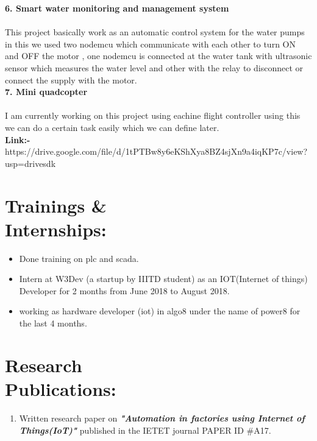 \documentclass[10pt]{report}
\begin{document}
\noindent\textbf{\large 6. Smart water monitoring and management system\\[1pt]}
\\This project basically work as an automatic control system for the water pumps in this we used two nodemcu which communicate with each other to turn ON and OFF the motor , one nodemcu is connected at the water tank with ultrasonic sensor which measures the water level and other with the relay to disconnect or connect the supply with the motor.\\[2pt] 

\noindent\textbf{\large 7. Mini quadcopter\\[1pt]}
\\I am currently working on this project using eachine flight controller using this we can do a certain task easily which we can define later.
\\\textbf{Link:-} https://drive.google.com/file/d/1tPTBw8y6eKShXya8BZ4sjXn9a4iqKP7c/view?usp=drivesdk




\section*{Trainings \&\\ Internships:} %
\begin{itemize}
\item Done training on plc and scada.
\item Intern at W3Dev (a startup by IIITD student) as an IOT(Internet of things) Developer for 2 months from June 2018 to August 2018.
\item working as hardware developer (iot) in algo8 under the name of power8 for the last 4 months.
\end{itemize}

\section*{Research \\Publications:} %
\begin{enumerate}
	\item Written research paper on \textbf{\textit{"Automation in factories using Internet of Things(IoT)"}} published in the IETET journal   PAPER ID \#A17.
\end{enumerate}
\end{document}
